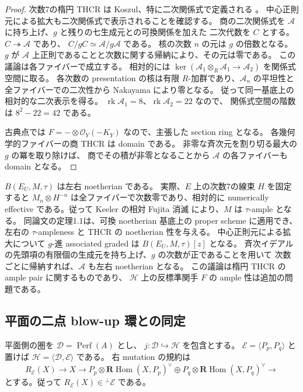 \begin{proof}
次数7の楕円 THCR は Koszul、特に二次関係式で定義される
\cite[定理3.19]{PencilRainsFiltered}。
中心正則元による拡大も二次関係式で表示されることを確認する。
商の二次関係式を $\mathscr A$ に持ち上げ、$g$ と残りの七生成元との可換関係を加えた
二次代数を $C$ とする。$C\twoheadrightarrow\mathscr A$ であり、
$C/gC\simeq\mathscr A/g\mathscr A$ である。
核の次数 $n$ の元は $g$ の倍数となる。
$g$ が $\mathscr A$ 上正則であることと次数に関する帰納により、その元は零である。
この議論は各ファイバーで成立する。
相対的には
$\ker(\mathscr A_1\otimes_R\mathscr A_1\to\mathscr A_2)$ を関係式空間に取る。
各次数の presentation の核は有限 $R$-加群であり、$\mathscr A_n$ の平坦性と
全ファイバーでの二次性から Nakayama により零となる。
従って同一基底上の相対的な二次表示を得る。
$\operatorname{rk}\mathscr A_1=8$、$\operatorname{rk}\mathscr A_2=22$ なので、
関係式空間の階数は $8^2-22=42$ である。

古典点では $F=-\otimes\mathcal O_Y(-K_Y)$ なので、主張した section ring となる。
各幾何学的ファイバーの商 THCR は domain である。
非零な斉次元を割り切る最大の $g$ の冪を取り除けば、
商でその積が非零となることから $\mathscr A$ の各ファイバーも domain となる。
\end{proof}

\begin{remark}\label{rem:ac-noetherian}
$B(E_U,M,\tau)$ は左右 noetherian である。
実際、$E$ 上の次数7の線束 $H$ を固定すると
$M_n\otimes H^{-n}$ は全ファイバーで次数零であり、相対的に numerically effective
である。従って Keeler の相対 Fujita 消滅
\cite[定理1.5]{ACKeelerAmple} により、$M$ は $\tau$-ample となる。
同論文の定理1.1は、可換 noetherian 基底上の proper scheme に適用でき、
左右の $\tau$-ampleness と THCR の noetherian 性を与える。
中心正則元による拡大について $g$-進 associated graded は
$B(E_U,M,\tau)[z]$ となる。
斉次イデアルの先頭項の有限個の生成元を持ち上げ、$g$ の次数が正であることを用いて
次数ごとに帰納すれば、$\mathscr A$ も左右 noetherian となる。
この議論は楕円 THCR の ample pair に関するものであり、
$\mathcal H$ 上の反標準関手 $F$ の ample 性は追加の問題である。
\end{remark}

\subsection{平面の二点 blow-up 環との同定}

平面側の圏を $\mathcal D=\operatorname{Perf}(A)$ とし、
$j\colon\mathcal D\hookrightarrow\mathcal H$ を包含とする。
$\mathcal E=\langle P_p,P_q\rangle$ と置けば
$\mathcal H=\langle\mathcal D,\mathcal E\rangle$ である。
右 mutation の規約は
\[
 R_{\mathcal E}(X)\longrightarrow X\longrightarrow
 P_p\otimes\mathbf R\operatorname{Hom}(X,P_p)^\vee
 \oplus P_q\otimes\mathbf R\operatorname{Hom}(X,P_q)^\vee
 \longrightarrow
\]
とする。従って $R_{\mathcal E}(X)\in{}^\perp\mathcal E$ である。

